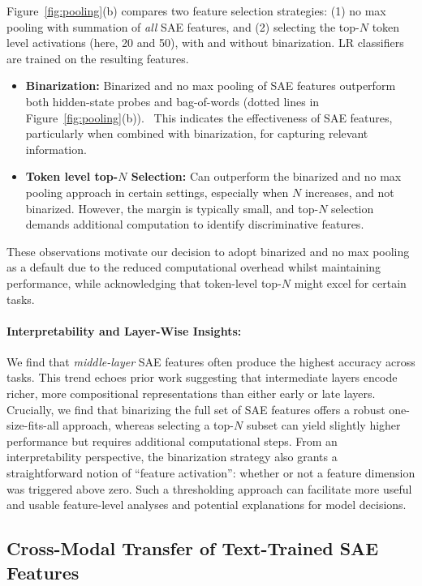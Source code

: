 Figure~\ref{fig:pooling}(b) compares two feature selection strategies: (1) no max pooling with summation of \emph{all} SAE features, and (2) selecting the top-$N$ token level activations (here, 20 and 50), with and without binarization. LR classifiers are trained on the resulting features.
\begin{itemize}[itemsep=-1.7pt,topsep=1.5pt]
    \item \textbf{Binarization:}  Binarized and no max pooling of SAE features outperform both hidden-state probes and bag-of-words (dotted lines in Figure~\ref{fig:pooling}(b)).  This indicates the effectiveness of SAE features, particularly when combined with binarization, for capturing relevant information.
    \item \textbf{Token level top-$N$ Selection:} Can outperform the binarized and no max pooling approach in certain settings, especially when $N$ increases, and not binarized. However, the margin is typically small, and top-$N$ selection demands additional computation to identify discriminative features.
\end{itemize}

These observations motivate our decision to adopt binarized and no max pooling as a default due to the reduced computational overhead whilst maintaining performance, while acknowledging that token-level top-$N$ might excel for certain tasks.
\vspace{-3pt}

\paragraph{Interpretability and Layer-Wise Insights:}
We find that \emph{middle-layer} SAE features often produce the highest accuracy across tasks. This trend echoes prior work suggesting that intermediate layers encode richer, more compositional representations than either early or late layers. Crucially, we find that binarizing the full set of SAE features offers a robust one-size-fits-all approach, whereas selecting a top-$N$ subset can yield slightly higher performance but requires additional computational steps. From an interpretability perspective, the binarization strategy also grants a straightforward notion of “feature activation”: whether or not a feature dimension was triggered above zero. Such a thresholding approach can facilitate more useful and usable feature-level analyses and potential explanations for model decisions.

\subsection{Cross-Modal Transfer of Text-Trained SAE Features}

